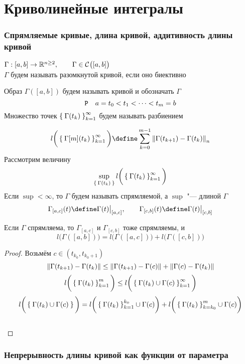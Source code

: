 \part{Криволинейные интегралы}

\section{Спрямляемые кривые, длина кривой, аддитивность длины кривой}

\begin{definition}
	$ \Gamma : [a, b] \to \R^{n \ge 2}, \qquad \Gamma \in \Cont{[a, b]} $ \\
	$ \Gamma $ будем называть разомкнутой кривой, если оно биективно
\end{definition}

Образ $ \Gamma([a, b]) $ будем называть кривой и обозначать $ \Gamma $
$$ \Par \quad a = t_0 < t_1 < \dots < t_m = b $$
Множество точек $ \seq{\Gamma(t_k)}k $ будем называть разбиением

$$ l \bigg( \seq{\Gamma[m](t_k)}k \bigg) \define \sum_{k = 0}^{m - 1} \norm{\Gamma(t_{k + 1}) - \Gamma(t_k)}_n $$
Рассмотрим величину
$$ \sup\limits_{\set{\Gamma(t_k)}} l \bigg( \seq{\Gamma(t_k)}k \bigg) $$
Если $ \sup < \infty $, то $ \Gamma $ будем называть спрямляемой, а $ \sup $ "--- длиной $ \Gamma $
$$ \Gamma_{[a, c]}(t) \define \Gamma(t)\clamp{[a, c]}, \qquad \Gamma_{[c, b]} (t) \define \Gamma(t)\clamp{[c, b]} $$

\begin{statement}
	Если $ \Gamma $ спрямляема, то $ \Gamma_{[a, c]} $ и $ \Gamma_{[c, b]} $ тоже спрямляемы, и
	$$ l \bigg( \Gamma([a, b]) \bigg) = l \bigg( \Gamma([a, c]) \bigg) + l \bigg( \Gamma([c, b]) \bigg) $$
\end{statement}

\begin{proof}
	Возьмём $ c \in (t_{k_0}, t_{k_0 + 1}) $
	$$ \norm{\Gamma(t_{k + 1}) - \Gamma(t_k)} \le \norm{\Gamma(t_{k + 1}) - \Gamma(c)} + \norm{\Gamma(c) - \Gamma(t_k)} $$
	$$ l \bigg( \seq[m]{\Gamma(t_k)}k \bigg) \le l \bigg( \seq{\Gamma(t_k) \cup \Gamma(c)}k \bigg) $$
	$$ l \bigg( \set{\Gamma(t_k) \cup \Gamma(c)} \bigg) = l \bigg( \seq[k_0]{\Gamma(t_k)}k \cup \Gamma(c) \bigg) + l \bigg( \seqv[m]{\Gamma(t_k)}k{k_0} \cup \Gamma(c) \bigg) $$
	\widedots[10cm] \\
\end{proof}

\section{Непрерывность длины кривой как функции от параметра}

